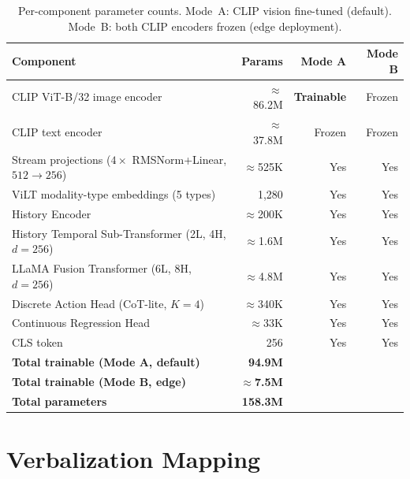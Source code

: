\documentclass{article}
\begin{document}
\begin{table}[h]
\centering
\caption{Per-component parameter counts.
  Mode~A: CLIP vision fine-tuned (default).
  Mode~B: both CLIP encoders frozen (edge deployment).}
\label{tab:params}
\small
\begin{tabular}{lrrr}
\toprule
\textbf{Component} & \textbf{Params} & \textbf{Mode A} & \textbf{Mode B} \\
\midrule
CLIP ViT-B/32 image encoder              & ${\approx}$86.2M & \textbf{Trainable} & Frozen \\
CLIP text encoder                        & ${\approx}$37.8M & Frozen          & Frozen \\
\midrule
Stream projections ($4{\times}$ RMSNorm+Linear, $512{\to}256$) & ${\approx}$525K & Yes & Yes \\
ViLT modality-type embeddings (5 types)  & 1,280            & Yes             & Yes \\
History Encoder                          & ${\approx}$200K  & Yes             & Yes \\
History Temporal Sub-Transformer (2L, 4H, $d{=}256$) & ${\approx}$1.6M & Yes & Yes \\
LLaMA Fusion Transformer (6L, 8H, $d{=}256$) & ${\approx}$4.8M & Yes        & Yes \\
Discrete Action Head (CoT-lite, $K{=}4$) & ${\approx}$340K  & Yes             & Yes \\
Continuous Regression Head               & ${\approx}$33K   & Yes             & Yes \\
CLS token                                & 256              & Yes             & Yes \\
\midrule
\textbf{Total trainable (Mode A, default)} & \textbf{94.9M}           & & \\
\textbf{Total trainable (Mode B, edge)}  & ${\approx}$\textbf{7.5M} & & \\
\textbf{Total parameters}               & \textbf{158.3M}           & & \\
\bottomrule
\end{tabular}
\end{table}

\section{Verbalization Mapping}
\label{app:verbalization}
\end{document}
